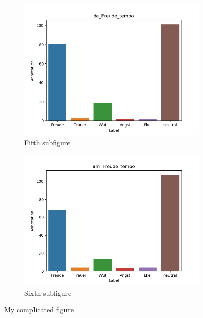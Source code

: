 \documentclass[11pt,a4paper,headsepline,twoside,toc=bibliography]{scrreprt}
\begin{document}
\begin{figure}[t!]
	\medskip
	\begin{subfigure}{0.48\textwidth}
		\includegraphics[width=\linewidth]{plots/de_Freude_tempo.png}
		\caption{Fifth subfigure} \label{fig:de_F_tempo}
	\end{subfigure}\hspace*{\fill}
	\begin{subfigure}{0.48\textwidth}
		\includegraphics[width=\linewidth]{plots/am_Freude_tempo.png}
		\caption{Sixth subfigure} \label{fig:am__F_tempo}
	\end{subfigure}
	
	\caption{My complicated figure} \label{fig:countplots_F}
\end{figure}
\end{document}
